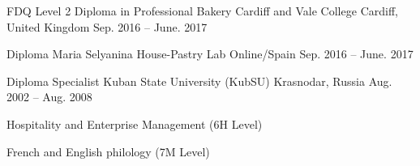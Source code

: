 

\begin{cventries}

  \cvsentry
    {FDQ Level 2 Diploma in Professional Bakery} %
    {Cardiff and Vale College} %
    {Cardiff, United Kingdom} %
    {Sep. 2016 -- June. 2017} %

  \cvsentry
    {Diploma} %
    {Maria Selyanina House-Pastry Lab} %
    {Online/Spain} %
    {Sep. 2016 -- June. 2017} %

  \cventry
    {Diploma Specialist} %
    {Kuban State University (KubSU)} %
    {Krasnodar, Russia} %
    {Aug. 2002 -- Aug. 2008} %
    {
      \begin{cvitems} %
        \item {Hospitality and Enterprise Management (6H Level)}
        \item {French and English philology (7M Level)}
      \end{cvitems}
    }


\end{cventries}
